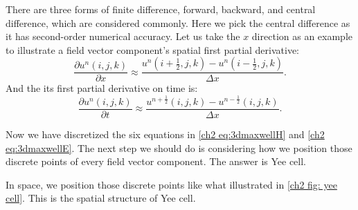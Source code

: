 There are three forms of finite difference, forward, backward, and central difference, which are considered commonly. Here we pick the central difference as it has second-order numerical accuracy. Let us take the $x$ direction as an example to illustrate a field vector component's spatial first partial derivative:
\begin{equation}\label{ch2 eq:space discrete}
\frac{\partial u^n(i,j,k)}{\partial x} \approx \frac{
	u^n(i+\frac{1}{2},j,k)-u^n(i-\frac{1}{2},j,k)
	}{\Delta x}.
\end{equation}
And the its first partial derivative on time is:
\begin{equation}\label{ch2 eq:time discrete}
\frac{\partial u^n(i,j,k)}{\partial t} \approx \frac{
	u^{n+\frac{1}{2}}(i,j,k)-u^{n-\frac{1}{2}}(i,j,k)
}{\Delta x}.
\end{equation}

Now we have discretized the six equations in \eqref{ch2 eq:3dmaxwellH} and \eqref{ch2 eq:3dmaxwellE}. The next step we should do is considering how we position those discrete points of every field vector component. The answer is Yee cell.

In space, we position those discrete points like what illustrated in \ref{ch2 fig: yee cell}. This is the spatial structure of Yee cell.

